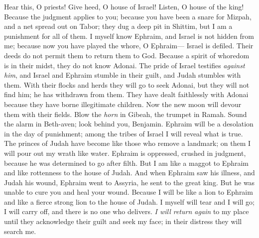 \begin{biblechapter} %
 Hear this, O priests! 
Give heed, O house of Israel! 
Listen, O house of the king! 
Because the judgment applies to you; 
because you have been a snare for Mizpah, 
and a net spread out on Tabor;
\verse they dug a deep pit in Shittim, 
but I am a punishment for all of them.
\verse I myself know Ephraim, 
and Israel is not hidden from me; 
because now you have played the whore, O Ephraim— 
Israel is defiled.
\verse Their deeds do not permit them 
to return them to God. 
Because a spirit of whoredom is in their midst, 
they do not know Adonai.
\verse The pride of Israel testifies \textit{against him}, 
and Israel and Ephraim stumble in their guilt, 
and Judah stumbles with them.
\verse With their flocks and herds they will go 
to seek Adonai, but they will not find him; 
he has withdrawn from them.
\verse They have dealt faithlessly with Adonai 
because they have borne illegitimate children. 
Now the new moon will devour them with their fields.
\verse Blow the \textit{horn} in Gibeah, 
the trumpet in Ramah. 
Sound the alarm in Beth-aven; 
look behind you, Benjamin.
\verse Ephraim will be a desolation 
in the day of punishment; 
among the tribes of Israel 
I will reveal what is true.
\verse The princes of Judah have become 
like those who remove a landmark; 
on them I will pour out 
my wrath like water.
\verse Ephraim is oppressed, 
crushed in judgment, 
because he was determined 
to go after filth.
\verse But I am like a maggot to Ephraim 
and like rottenness to the house of Judah.
\verse And when Ephraim saw his illness, 
and Judah his wound, 
Ephraim went to Assyria, 
he sent to the great king. 
But he was unable to cure you 
and heal your wound.
\verse Because I will be like a lion to Ephraim 
and like a fierce strong lion to the house of Judah. 
I myself will tear and I will go; 
I will carry off, and there is no one who delivers.
\verse \textit{I will return again} to my place 
until they acknowledge their guilt 
and seek my face; 
in their distress they will search me.
\end{biblechapter}

